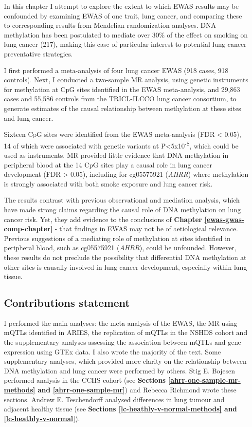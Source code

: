 \documentclass[11pt,twoside]{bristolthesis}
\begin{document}
In this chapter I attempt to explore the extent to which EWAS results may be confounded by examining EWAS of one trait, lung cancer, and comparing these to corresponding results from Mendelian randomization analyses. DNA methylation has been postulated to mediate over 30\% of the effect on smoking on lung cancer (217), making this case of particular interest to potential lung cancer preventative strategies.

I first performed a meta-analysis of four lung cancer EWAS (918 cases, 918 controls). Next, I conducted a two-sample MR analysis, using genetic instruments for methylation at CpG sites identified in the EWAS meta-analysis, and 29,863 cases and 55,586 controls from the TRICL-ILCCO lung cancer consortium, to generate estimates of the causal relationship between methylation at these sites and lung cancer.

Sixteen CpG sites were identified from the EWAS meta-analysis (FDR \textless{} 0.05), 14 of which were associated with genetic variants at P\textless5x10\textsuperscript{-8}, which could be used as instruments. MR provided little evidence that DNA methylation in peripheral blood at the 14 CpG sites play a causal role in lung cancer development (FDR \textgreater{} 0.05), including for cg05575921 (\emph{AHRR}) where methylation is strongly associated with both smoke exposure and lung cancer risk.

The results contrast with previous observational and mediation analysis, which have made strong claims regarding the causal role of DNA methylation on lung cancer risk. Yet, they add evidence to the conclusions of \textbf{Chapter \ref{ewas-gwas-comp-chapter}} - that findings in EWAS may not be of aetiological relevance. Previous suggestions of a mediating role of methylation at sites identified in peripheral blood, such as cg05575921 (\emph{AHRR}), could be unfounded. However, these results do not preclude the possibility that differential DNA methylation at other sites is causally involved in lung cancer development, especially within lung tissue.

\hypertarget{contributions-statement-07}{%
\subsection{Contributions statement}\label{contributions-statement-07}}

I performed the main analyses: the meta-analysis of the EWAS, the MR using mQTLs identified in ARIES, the replication of mQTLs in the NSHDS cohort and the supplementary analyses assessing the association between mQTLs and gene expression using GTEx data. I also wrote the majority of the text. Some supplementary analyses, which provided more clarity on the relationship between DNA methylation and lung cancer were performed by others. Stig E. Bojesen performed analysis in the CCHS cohort (see \textbf{Sections \ref{ahrr-one-sample-mr-methods} and \ref{ahrr-one-sample-mr}}) and Rebecca Richmond wrote these sections. Andrew E. Teschendorff analysed differences in lung tumour and adjacent healthy tissue (see \textbf{Sections \ref{lc-heathly-v-normal-methods} and \ref{lc-heathly-v-normal}}).
\end{document}
